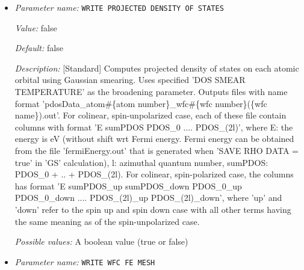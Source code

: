 \begin{itemize}
{\it Value:} false


{\it Default:} false


{\it Description:} [Standard] Computes local density of states on each atom using Lorentzians. Uses specified Temperature for SCF as the broadening parameter. Outputs a file name 'ldosData.out' containing NUMATOM+1 columns with first column indicating the energy in eV and all other NUMATOM columns indicating local density of states for each of the NUMATOM atoms.


{\it Possible values:} A boolean value (true or false)
\item {\it Parameter name:} {\tt WRITE PROJECTED DENSITY OF STATES}
\label{parameters:Post_2dprocessing Options/WRITE PROJECTED DENSITY OF STATES}
\label{parameters:Post_2dprocessing_20Options/WRITE_20PROJECTED_20DENSITY_20OF_20STATES}


{\it Value:} false


{\it Default:} false


{\it Description:} [Standard] Computes projected density of states on each atomic orbital using Gaussian smearing. Uses specified 'DOS SMEAR TEMPERATURE' as the broadening parameter. Outputs files with name format 'pdosData\_atom\#\{atom number\}\_wfc\#\{wfc number\}(\{wfc name\}).out'. For colinear, spin-unpolarized case, each of these file contain columns with format 'E sumPDOS  PDOS\_0 .... PDOS\_(2l)', where E: the energy is eV (without shift wrt Fermi energy. Fermi energy can be obtained from the file 'fermiEnergy.out' that is generated when 'SAVE RHO DATA = true' in 'GS' calculation), l: azimuthal quantum number, sumPDOS: PDOS\_0 + .. + PDOS\_(2l). 
For colinear, spin-polarized case, the columns has format 'E sumPDOS\_up sumPDOS\_down PDOS\_0\_up PDOS\_0\_down .... PDOS\_(2l)\_up PDOS\_(2l)\_down', where 'up' and 'down' refer to the spin up and spin down case with all other terms having the same meaning as of the spin-unpolarized case.


{\it Possible values:} A boolean value (true or false)
\item {\it Parameter name:} {\tt WRITE WFC FE MESH}
\label{parameters:Post_2dprocessing Options/WRITE WFC FE MESH}
\label{parameters:Post_2dprocessing_20Options/WRITE_20WFC_20FE_20MESH}



\end{itemize}
